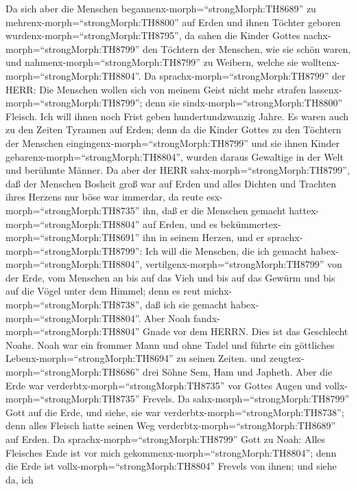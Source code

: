  Da sich aber die Menschen
begannenx-morph=``strongMorph:TH8689'' zu
mehrenx-morph=``strongMorph:TH8800'' auf Erden und ihnen Töchter geboren
wurdenx-morph=``strongMorph:TH8795'',  da sahen die Kinder
Gottes nachx-morph=``strongMorph:TH8799'' den Töchtern der Menschen, wie
sie schön waren, und nahmenx-morph=``strongMorph:TH8799'' zu Weibern,
welche sie wolltenx-morph=``strongMorph:TH8804''.  Da
sprachx-morph=``strongMorph:TH8799'' der HERR: Die Menschen wollen sich
von meinem Geist nicht mehr strafen
lassenx-morph=``strongMorph:TH8799''; denn sie
sindx-morph=``strongMorph:TH8800'' Fleisch. Ich will ihnen noch Frist
geben hundertundzwanzig Jahre.  Es waren auch zu den Zeiten
Tyrannen auf Erden; denn da die Kinder Gottes zu den Töchtern der
Menschen eingingenx-morph=``strongMorph:TH8799'' und sie ihnen Kinder
gebarenx-morph=``strongMorph:TH8804'', wurden daraus Gewaltige in der
Welt und berühmte Männer.  Da aber der HERR
sahx-morph=``strongMorph:TH8799'', daß der Menschen Bosheit groß war auf
Erden und alles Dichten und Trachten ihres Herzens nur böse war
immerdar,  da reute esx-morph=``strongMorph:TH8735'' ihn,
daß er die Menschen gemacht hattex-morph=``strongMorph:TH8804'' auf
Erden, und es bekümmertex-morph=``strongMorph:TH8691'' ihn in seinem
Herzen,  und er sprachx-morph=``strongMorph:TH8799'': Ich
will die Menschen, die ich gemacht habex-morph=``strongMorph:TH8804'',
vertilgenx-morph=``strongMorph:TH8799'' von der Erde, vom Menschen an
bis auf das Vieh und bis auf das Gewürm und bis auf die Vögel unter dem
Himmel; denn es reut michx-morph=``strongMorph:TH8738'', daß ich sie
gemacht habex-morph=``strongMorph:TH8804''.  Aber Noah
fandx-morph=``strongMorph:TH8804'' Gnade vor dem HERRN. 
Dies ist das Geschlecht Noahs. Noah war ein frommer Mann und ohne Tadel
und führte ein göttliches Lebenx-morph=``strongMorph:TH8694'' zu seinen
Zeiten.  und zeugtex-morph=``strongMorph:TH8686'' drei
Söhne Sem, Ham und Japheth.  Aber die Erde war
verderbtx-morph=``strongMorph:TH8735'' vor Gottes Augen und
vollx-morph=``strongMorph:TH8735'' Frevels.  Da
sahx-morph=``strongMorph:TH8799'' Gott auf die Erde, und siehe, sie war
verderbtx-morph=``strongMorph:TH8738''; denn alles Fleisch hatte seinen
Weg verderbtx-morph=``strongMorph:TH8689'' auf Erden.  Da
sprachx-morph=``strongMorph:TH8799'' Gott zu Noah: Alles Fleisches Ende
ist vor mich gekommenx-morph=``strongMorph:TH8804''; denn die Erde ist
vollx-morph=``strongMorph:TH8804'' Frevels von ihnen; und siehe da, ich
